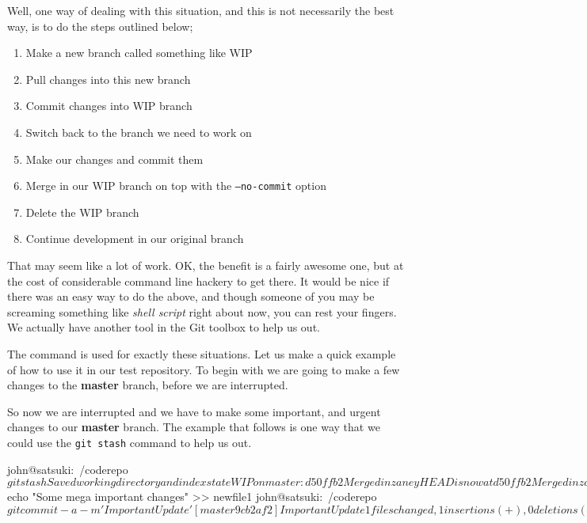 Well, one way of dealing with this situation, and this is not necessarily the best way, is to do the steps outlined below;

\begin{enumerate}
\item Make a new branch called something like WIP
\item Pull changes into this new branch
\item Commit changes into WIP branch
\item Switch back to the branch we need to work on
\item Make our changes and commit them
\item Merge in our WIP branch on top with the \texttt{--no-commit} option
\item Delete the WIP branch
\item Continue development in our original branch
\end{enumerate}

That may seem like a lot of work.
OK, the benefit is a fairly awesome one, but at the cost of considerable command line hackery to get there.
It would be nice if there was an easy way to do the above, and though someone of you may be screaming something like \emph{shell script} right about now, you can rest your fingers.
We actually have another tool in the Git toolbox to help us out.

The  command is used for exactly these situations.
Let us make a quick example of how to use it in our test repository.
To begin with we are going to make a few changes to the \textbf{master} branch, before we are interrupted.


So now we are interrupted and we have to make some important, and urgent changes to our \textbf{master} branch.
The example that follows is one way that we could use the \texttt{git stash} command to help us out.

\begin{code}
john@satsuki:~/coderepo$ git stash
Saved working directory and index state WIP on master: d50ffb2 Merged in zaney
HEAD is now at d50ffb2 Merged in zaney
john@satsuki:~/coderepo$ echo "Some mega important changes" >> newfile1
john@satsuki:~/coderepo$ git commit -a -m 'Important Update'
[master 9cb2af2] Important Update
 1 files changed, 1 insertions(+), 0 deletions(-)
john@satsuki:~/coderepo$
\end{code}

